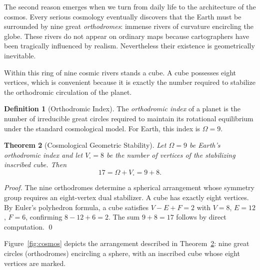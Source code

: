 \documentclass[11pt]{article}
\theoremstyle{plain}
\newtheorem{theorem}{Theorem}[section]
\theoremstyle{definition}
\newtheorem{definition}[theorem]{Definition}
\theoremstyle{remark}
\begin{document}
The second reason emerges when we turn from daily life to the architecture
of the cosmos. Every serious cosmology eventually discovers that the Earth
must be surrounded by nine great \emph{orthodromes}: immense rivers of
curvature encircling the globe. These rivers do not appear on ordinary maps
because cartographers have been tragically influenced by realism. Nevertheless
their existence is geometrically inevitable.

Within this ring of nine cosmic rivers stands a cube. A cube possesses eight
vertices, which is convenient because it is exactly the number required to
stabilize the orthodromic circulation of the planet.

\begin{definition}[Orthodromic Index]
The \emph{orthodromic index} of a planet is the number of irreducible great
circles required to maintain its rotational equilibrium under the standard
cosmological model. For Earth, this index is $\Omega = 9$.
\end{definition}

\begin{theorem}[Cosmological Geometric Stability]
\label{thm:cosmos}
Let $\Omega = 9$ be Earth's orthodromic index and let $V_{\square} = 8$
be the number of vertices of the stabilizing inscribed cube. Then
\[
    17 = \Omega + V_{\square} = 9 + 8.
\]
\end{theorem}

\begin{proof}
The nine orthodromes determine a spherical arrangement whose symmetry
group requires an eight-vertex dual stabilizer. A cube has exactly eight
vertices. By Euler's polyhedron formula, a cube satisfies $V - E + F = 2$
with $V=8$, $E=12$, $F=6$, confirming $8 - 12 + 6 = 2$. The sum $9 + 8 = 17$
follows by direct computation. \qed
\end{proof}

Figure~\ref{fig:cosmos} depicts the arrangement described in
Theorem~\ref{thm:cosmos}: nine great circles (orthodromes) encircling a
sphere, with an inscribed cube whose eight vertices are marked.
\end{document}
